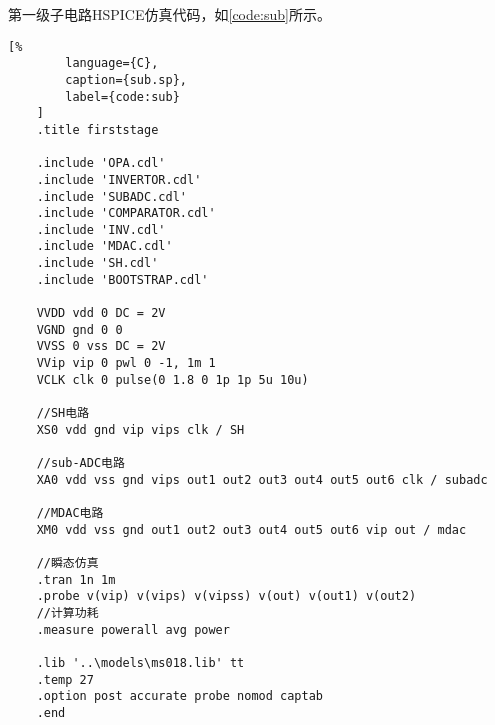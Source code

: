     \par 第一级子电路HSPICE仿真代码，如\autoref{code:sub}所示。
    \begin{lstlisting}[%
        language={C},
        caption={sub.sp},
        label={code:sub}
    ]
    .title firststage

    .include 'OPA.cdl'
    .include 'INVERTOR.cdl'
    .include 'SUBADC.cdl'
    .include 'COMPARATOR.cdl'
    .include 'INV.cdl'
    .include 'MDAC.cdl'
    .include 'SH.cdl'
    .include 'BOOTSTRAP.cdl'

    VVDD vdd 0 DC = 2V
    VGND gnd 0 0
    VVSS 0 vss DC = 2V
    VVip vip 0 pwl 0 -1, 1m 1
    VCLK clk 0 pulse(0 1.8 0 1p 1p 5u 10u)

    //SH电路
    XS0 vdd gnd vip vips clk / SH

    //sub-ADC电路
    XA0 vdd vss gnd vips out1 out2 out3 out4 out5 out6 clk / subadc

    //MDAC电路
    XM0 vdd vss gnd out1 out2 out3 out4 out5 out6 vip out / mdac

    //瞬态仿真
    .tran 1n 1m
    .probe v(vip) v(vips) v(vipss) v(out) v(out1) v(out2)
    //计算功耗
    .measure powerall avg power

    .lib '..\models\ms018.lib' tt
    .temp 27
    .option post accurate probe nomod captab
    .end
    \end{lstlisting}



